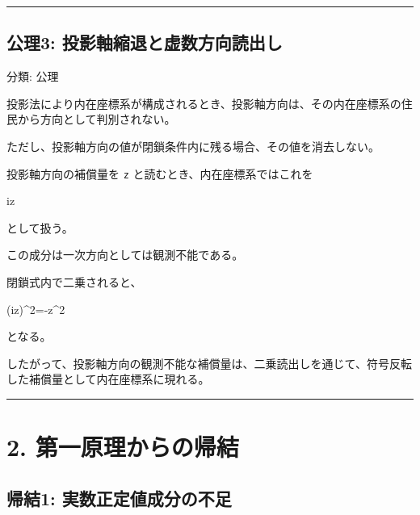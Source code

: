 \documentclass[
  a4paper,
]{ltjsarticle}
\newenvironment{Shaded}{}{}
\newcommand{\NormalTok}[1]{#1}
\begin{document}
\begin{center}\rule{0.5\linewidth}{0.5pt}\end{center}

\subsection{公理3:
投影軸縮退と虚数方向読出し}\label{ux516cux74063-ux6295ux5f71ux8ef8ux7e2eux9000ux3068ux865aux6570ux65b9ux5411ux8aadux51faux3057}

分類: 公理

投影法により内在座標系が構成されるとき、投影軸方向は、その内在座標系の住民から方向として判別されない。

ただし、投影軸方向の値が閉鎖条件内に残る場合、その値を消去しない。

投影軸方向の補償量を \texttt{z} と読むとき、内在座標系ではこれを

\begin{Shaded}
\begin{Highlighting}[]
\NormalTok{iz}
\end{Highlighting}
\end{Shaded}

として扱う。

この成分は一次方向としては観測不能である。

閉鎖式内で二乗されると、

\begin{Shaded}
\begin{Highlighting}[]
\NormalTok{(iz)\^{}2={-}z\^{}2}
\end{Highlighting}
\end{Shaded}

となる。

したがって、投影軸方向の観測不能な補償量は、二乗読出しを通じて、符号反転した補償量として内在座標系に現れる。

\begin{center}\rule{0.5\linewidth}{0.5pt}\end{center}

\section{2.
第一原理からの帰結}\label{ux7b2cux4e00ux539fux7406ux304bux3089ux306eux5e30ux7d50}

\subsection{帰結1:
実数正定値成分の不足}\label{ux5e30ux7d501-ux5b9fux6570ux6b63ux5b9aux5024ux6210ux5206ux306eux4e0dux8db3}
\end{document}
